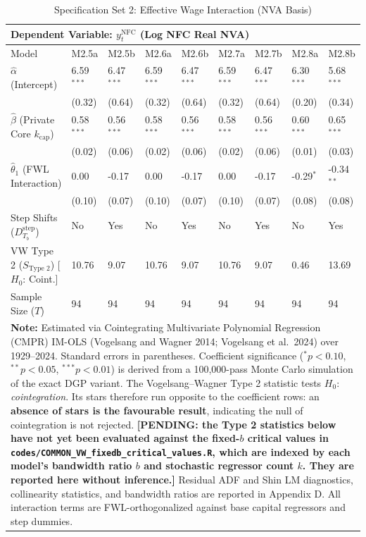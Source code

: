\begin{table}[H]
\centering
\setlength{\tabcolsep}{2.5pt}
\caption{Specification Set 2: Effective Wage Interaction (NVA Basis)}
\label{tab:specA_set2_nva_core}
\scriptsize
\begin{tabular}{p{3.8cm}p{1.1cm}p{1.1cm}p{1.1cm}p{1.1cm}p{1.1cm}p{1.1cm}p{1.1cm}p{1.1cm}}
\toprule
\multicolumn{9}{l}{\textbf{Dependent Variable: $y_t^{\text{NFC}}$ (Log NFC Real NVA)}} \\
\midrule
Model & M2.5a & M2.5b & M2.6a & M2.6b & M2.7a & M2.7b & M2.8a & M2.8b \\
\midrule
$\hat{\alpha}$ (Intercept) & 6.59$^{***}$ & 6.47$^{***}$ & 6.59$^{***}$ & 6.47$^{***}$ & 6.59$^{***}$ & 6.47$^{***}$ & 6.30$^{***}$ & 5.68$^{***}$ \\
 & (0.32) & (0.64) & (0.32) & (0.64) & (0.32) & (0.64) & (0.20) & (0.34) \\
$\hat{\beta}$ (Private Core $k_{\text{cap}}$) & 0.58$^{***}$ & 0.56$^{***}$ & 0.58$^{***}$ & 0.56$^{***}$ & 0.58$^{***}$ & 0.56$^{***}$ & 0.60$^{***}$ & 0.65$^{***}$ \\
 & (0.02) & (0.06) & (0.02) & (0.06) & (0.02) & (0.06) & (0.01) & (0.03) \\
$\hat{\theta}_1$ (FWL Interaction) & 0.00 & -0.17 & 0.00 & -0.17 & 0.00 & -0.17 & -0.29$^{*}$ & -0.34$^{**}$ \\
 & (0.10) & (0.07) & (0.10) & (0.07) & (0.10) & (0.07) & (0.08) & (0.08) \\
Step Shifts ($D_{T_b}^{\text{step}}$) & No & Yes & No & Yes & No & Yes & No & Yes \\
\midrule
VW Type 2 ($S_{\text{Type 2}}$) [$H_0$: Coint.] & 10.76 & 9.07 & 10.76 & 9.07 & 10.76 & 9.07 & 0.46 & 13.69 \\
\midrule
Sample Size ($T$) & 94 & 94 & 94 & 94 & 94 & 94 & 94 & 94 \\
\bottomrule
\multicolumn{9}{p{14.5cm}}{\footnotesize \textbf{Note:} Estimated via Cointegrating Multivariate Polynomial Regression (CMPR) IM-OLS (Vogelsang and Wagner 2014; Vogelsang et al.\ 2024) over 1929--2024. Standard errors in parentheses. Coefficient significance ($^* p < 0.10$, $^{**} p < 0.05$, $^{***} p < 0.01$) is derived from a 100,000-pass Monte Carlo simulation of the exact DGP variant. The Vogelsang--Wagner Type 2 statistic tests $H_0$: \emph{cointegration}. Its stars therefore run opposite to the coefficient rows: an \textbf{absence of stars is the favourable result}, indicating the null of cointegration is not rejected. \textbf{[PENDING: the Type 2 statistics below have not yet been evaluated against the fixed-$b$ critical values in \texttt{codes/COMMON\_VW\_fixedb\_critical\_values.R}, which are indexed by each model's bandwidth ratio $b$ and stochastic regressor count $k$. They are reported here without inference.]} Residual ADF and Shin LM diagnostics, collinearity statistics, and bandwidth ratios are reported in Appendix D. All interaction terms are FWL-orthogonalized against base capital regressors and step dummies.} \\
\end{tabular}
\end{table}
